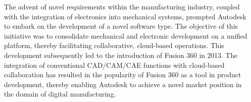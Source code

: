 The advent of novel requirements within the manufacturing industry, coupled with the integration of electronics into mechanical systems, prompted Autodesk to embark on the development of a novel software type. The objective of this initiative was to consolidate mechanical and electronic development on a unified platform, thereby facilitating collaborative, cloud-based operations. This development subsequently led to the introduction of Fusion 360 in 2013.\autocite{wikipedia_autodesk_deutsch}
The integration of conventional CAD/CAM/CAE functions with cloud-based collaboration has resulted in the popularity of Fusion 360 as a tool in product development, thereby enabling Autodesk to achieve a novel market position in the domain of digital manufacturing.

